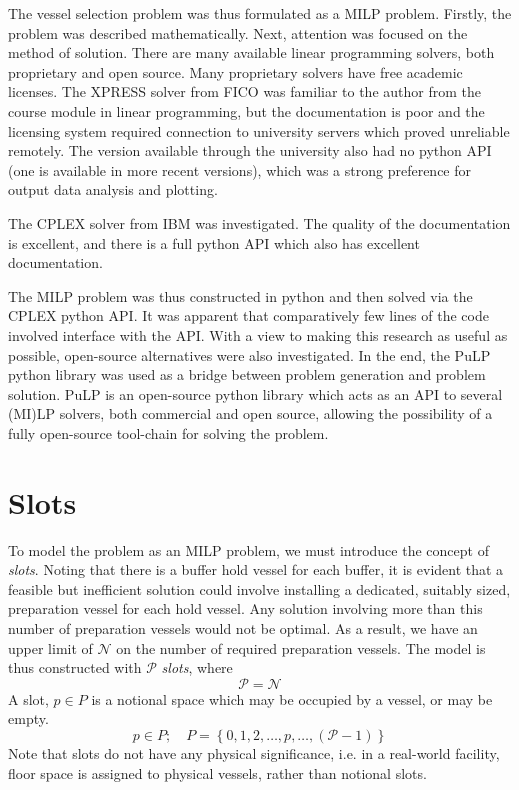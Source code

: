 The vessel selection problem was thus formulated as a MILP problem.
Firstly, the problem was described mathematically.
Next, attention was focused on the method of solution.
There are many available linear programming solvers, both proprietary and open
source.
Many proprietary solvers have free academic licenses.
The XPRESS solver from FICO was familiar to the author from the course module
in linear programming, but the documentation is poor and the licensing system
required connection to university servers which proved unreliable remotely.
The version available through the university also had no python API (one is
available in more recent versions), which was a strong preference for output
data analysis and plotting.

The CPLEX solver from IBM was investigated.
The quality of the documentation is excellent, and there is a full python API
which also has excellent documentation.

The MILP problem was thus constructed in python and then solved via the CPLEX
python API.
It was apparent that comparatively few lines of the code involved interface
with the API.
With a view to making this research as useful as possible, open-source
alternatives were also investigated.
In the end, the PuLP python library was used as a bridge between problem
generation and problem solution.
PuLP is an open-source python library which acts as an API to several
(MI)LP solvers, both commercial and open source, allowing the possibility of a
fully open-source tool-chain for solving the problem.

\section{Slots}\label{S.slots}

To model the problem as an MILP problem, we must introduce the concept of
\emph{slots}.
Noting that there is a buffer hold vessel for each buffer, it is evident that
a feasible but inefficient solution could involve installing a dedicated,
suitably sized, preparation vessel for each hold vessel.
Any solution involving more than this number of preparation vessels would not
be optimal.
As a result, we have an upper limit of $\mathcal{N}$ on the number of required
preparation vessels.
The model is thus constructed with $\mathcal{P}$ \emph{slots}, where
\begin{equation}
    \mathcal{P} = \mathcal{N}
\end{equation}
A slot, $p \in P$ is a notional space which may be occupied by a vessel, or may
be empty.
\begin{equation}
    p \in P; \quad P = \left\{ 0, 1, 2, \ldots, p, \ldots, \left( 
    \mathcal{P} - 1 \right) \right\}
\end{equation}
Note that slots do not have any physical significance, i.e. in a real-world
facility, floor space is assigned to physical vessels, rather than notional
slots.

